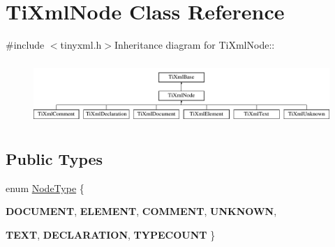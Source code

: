 \hypertarget{class_ti_xml_node}{
\section{TiXmlNode Class Reference}
\label{class_ti_xml_node}
}


{\ttfamily \#include $<$tinyxml.h$>$}Inheritance diagram for TiXmlNode::\begin{figure}[H]
\begin{center}
\leavevmode
\includegraphics[height=2.41379cm]{class_ti_xml_node}
\end{center}
\end{figure}
\subsection*{Public Types}
\begin{DoxyCompactItemize}
\item 
enum \hyperlink{class_ti_xml_node_a836eded4920ab9e9ef28496f48cd95a2}{NodeType} \{ \par
{\bfseries DOCUMENT}, 
{\bfseries ELEMENT}, 
{\bfseries COMMENT}, 
{\bfseries UNKNOWN}, 
\par
{\bfseries TEXT}, 
{\bfseries DECLARATION}, 
{\bfseries TYPECOUNT}
 \}
\end{DoxyCompactItemize}

